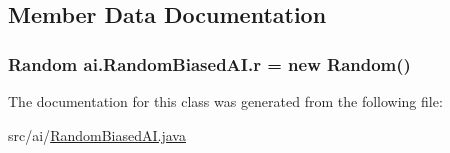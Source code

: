 \subsection{Member Data Documentation}
\hypertarget{classai_1_1_random_biased_a_i_ad0b6ab7aa1e7a359f6944ce85478dcc0}{
\subsubsection[{r}]{\setlength{\rightskip}{0pt plus 5cm}Random {\bf ai.RandomBiasedAI.r} = new Random()}}
\label{classai_1_1_random_biased_a_i_ad0b6ab7aa1e7a359f6944ce85478dcc0}


The documentation for this class was generated from the following file:\begin{DoxyCompactItemize}
\item 
src/ai/\hyperlink{_random_biased_a_i_8java}{RandomBiasedAI.java}\end{DoxyCompactItemize}
